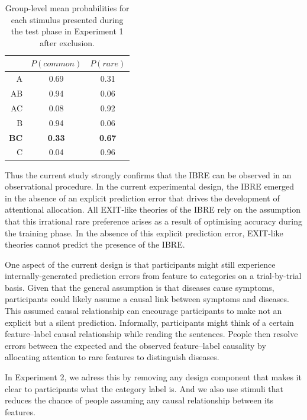 \documentclass[10pt,letterpaper]{article}
\begin{document}
\begin{table}[ht]
  \begin{center}
    \caption{Group-level mean probabilities for each stimulus presented during the test phase in Experiment 1 after exclusion. \\}
    \label{tab:results-exp1}
    \vskip 0.12in
    \begin{tabular}{rcc}
      \hline
      & $P(common)$ & $P(rare)$ \\
      \hline
      A & 0.69 & 0.31 \\
      AB & 0.94 & 0.06 \\
      AC & 0.08 & 0.92 \\
      B & 0.94 & 0.06 \\
      \textbf{BC} & \textbf{0.33} & \textbf{0.67} \\
      C & 0.04 & 0.96 \\
    \end{tabular}
  \end{center}
\end{table}

Thus the current study strongly confirms that the IBRE can be observed in an observational procedure.
In the current experimental design, the IBRE emerged in the absence of an explicit prediction error that drives the development of attentional allocation.
All EXIT-like theories of the IBRE rely on the assumption that this irrational rare preference arises as a result of optimising accuracy during the training phase.
In the absence of this explicit prediction error, EXIT-like theories cannot predict the presence of the IBRE.

One aspect of the current design is that participants might still experience internally-generated prediction errors from feature to categories on a trial-by-trial basis.
Given that the general assumption is that diseases cause symptoms, participants could likely assume a causal link between symptoms and diseases.
This assumed causal relationship can encourage participants to make not an explicit but a silent prediction.
Informally, participants might think of a certain feature--label causal relationship while reading the sentences.
People then resolve errors between the expected and the observed feature--label causality by allocating attention to rare features to distinguish diseases.

In Experiment 2, we adress this by removing any design component that makes it clear to participants what the category label is.
And we also use stimuli that reduces the chance of people assuming any causal relationship between its features.
\end{document}
